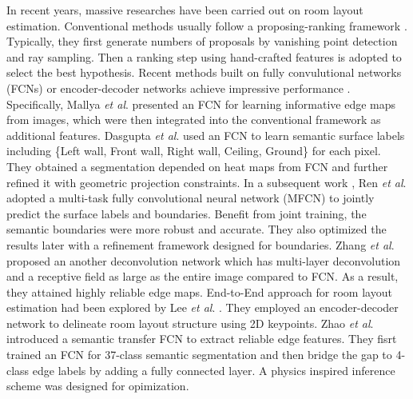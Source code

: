 In recent years, massive researches have been carried out on room layout estimation. Conventional methods usually follow a proposing-ranking framework \cite{hedau2009recovering,wang2013discriminative,gupta2010estimating,hedau2010thinking}. Typically, they first generate numbers of proposals by vanishing point detection and ray sampling. Then a ranking step using hand-crafted features is adopted to select the best hypothesis. Recent methods built on fully convulutional networks (FCNs) or encoder-decoder networks achieve impressive performance \cite{mallya2015learning,ren2016coarse,zhang2016learning,dasgupta2016delay,LeeRoomNet17,zhao2017physics}. Specifically, 
%
Mallya \emph{et al}. \cite{mallya2015learning} presented an FCN for learning informative edge maps from images, which were then integrated into the conventional framework as additional features. 
%
Dasgupta \emph{et al}. \cite{dasgupta2016delay} used an FCN to learn semantic surface labels including \{Left wall, Front wall, Right wall, Ceiling, Ground\} for each pixel. They obtained a segmentation depended on heat maps from FCN and further refined it with geometric projection constraints.
% 
In a subsequent work \cite{ren2016coarse}, Ren \emph{et al}. adopted a multi-task fully convolutional neural network (MFCN) to jointly predict the surface labels and boundaries. Benefit from joint training, the semantic boundaries were more robust and accurate. They also optimized the results later with a refinement framework designed for boundaries.
% 
Zhang \emph{et al}. \cite{zhang2016learning} proposed an another deconvolution network which has multi-layer deconvolution and a receptive field as large as the entire image compared to FCN. As a result, they attained highly reliable edge maps. 
%
End-to-End approach for room layout estimation had been explored by Lee \emph{et al}. \cite{LeeRoomNet17}. They employed an encoder-decoder network to delineate room layout structure using 2D keypoints.
%
Zhao \emph{et al}. \cite{zhao2017physics} introduced a semantic transfer FCN to extract reliable edge features. They fisrt trained an FCN for 37-class semantic segmentation and then bridge the gap to 4-class edge labels by adding a fully connected layer. A physics inspired inference scheme was designed for opimization.



